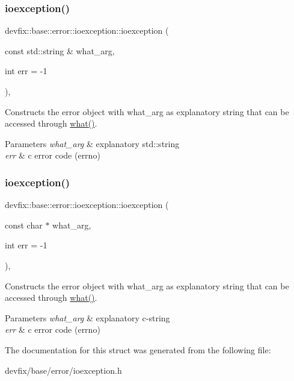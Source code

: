 \subsubsection{\texorpdfstring{ioexception()}{ioexception()}\hspace{0.1cm}{\footnotesize\ttfamily [1/2]}}
{\footnotesize\ttfamily devfix\+::base\+::error\+::ioexception\+::ioexception (\begin{DoxyParamCaption}\item[{const std\+::string \&}]{what\+\_\+arg,  }\item[{int}]{err = {\ttfamily -\/1} }\end{DoxyParamCaption})\hspace{0.3cm}{\ttfamily [inline]}, {\ttfamily [explicit]}}

Constructs the error object with what\+\_\+arg as explanatory string that can be accessed through \hyperlink{structdevfix_1_1base_1_1error_1_1baseexception_a16327152a55d65b1e537825231fbd452}{what()}. 
\begin{DoxyParams}{Parameters}
{\em what\+\_\+arg} & explanatory std\+::string \\
\hline
{\em err} & c error code (errno) \\
\hline
\end{DoxyParams}
\mbox{\label{structdevfix_1_1base_1_1error_1_1ioexception_a93e7dfc50605b9f6a9c5cd78dac59a44}} 
\subsubsection{\texorpdfstring{ioexception()}{ioexception()}\hspace{0.1cm}{\footnotesize\ttfamily [2/2]}}
{\footnotesize\ttfamily devfix\+::base\+::error\+::ioexception\+::ioexception (\begin{DoxyParamCaption}\item[{const char $\ast$}]{what\+\_\+arg,  }\item[{int}]{err = {\ttfamily -\/1} }\end{DoxyParamCaption})\hspace{0.3cm}{\ttfamily [inline]}, {\ttfamily [explicit]}}

Constructs the error object with what\+\_\+arg as explanatory string that can be accessed through \hyperlink{structdevfix_1_1base_1_1error_1_1baseexception_a16327152a55d65b1e537825231fbd452}{what()}. 
\begin{DoxyParams}{Parameters}
{\em what\+\_\+arg} & explanatory c-\/string \\
\hline
{\em err} & c error code (errno) \\
\hline
\end{DoxyParams}


The documentation for this struct was generated from the following file\+:\begin{DoxyCompactItemize}
\item 
devfix/base/error/ioexception.\+h\end{DoxyCompactItemize}
